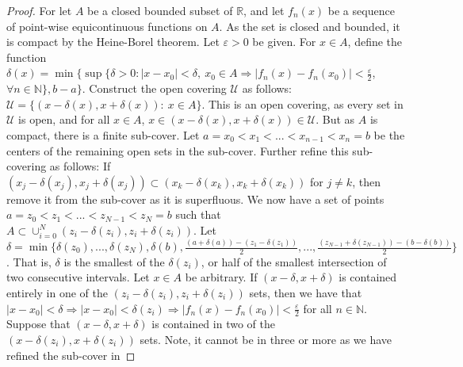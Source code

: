 \documentclass[crop=false,class=book,oneside]{standalone}
\begin{document}
            \begin{proof}
                For let $A$ be a closed bounded subset
                of $\mathbb{R}$, and let $f_n(x)$ be a sequence
                of point-wise equicontinuous functions on $A$.
                As the set is closed and bounded, it is compact
                by the Heine-Borel theorem. Let $\varepsilon>0$
                be given. For $x\in A$, define the function
                $\delta(x)%
                 =\min\{\sup\{\delta>0:|x-x_0|<\delta,\ x_0\in A%
                  \Rightarrow |f_n(x)-f_n(x_0)|<\frac{\varepsilon}{2}$,
                $\forall n\in\mathbb{N}\},b-a\}$.
                Construct the open covering $\mathcal{U}$ as
                follows:
                $\mathcal{U}=\{(x-\delta(x),x+\delta(x)):\ x\in A\}$.
                This is an open covering, as every set in
                $\mathcal{U}$ is open, and for all
                $x\in A$, $x\in(x-\delta(x),x+\delta(x))\in\mathcal{U}$.
                But as $A$ is compact, there is a finite sub-cover.
                Let $a=x_0<x_1<...<x_{n-1}<x_n=b$ be the centers
                of the remaining open sets in the sub-cover.
                Further refine this sub-covering as follows: If
                $(x_j-\delta(x_j),x_j+\delta(x_j))%
                 \subset (x_k-\delta(x_k),x_k+\delta(x_k))$
                for $j\ne k$, then remove it from the sub-cover as
                it is superfluous. We now have a set of points
                $a=z_0<z_1<...<z_{N-1}<z_N=b$ such that
                $A\subset\cup_{i=0}^{N} (z_i-\delta(z_i),z_i+\delta(z_i))$.
                Let
                $\delta%
                 =\min\{\delta(z_0),...,\delta(z_N),\delta(b),%
                        \frac{(a+\delta(a))-(z_1-\delta(z_1))}{2},%
                        ...,%
                        \frac{(z_{N-1}+\delta(z_{N-1}))-(b-\delta(b))}{2}\}$.
                That is, $\delta$ is the smallest of the $\delta(z_i)$,
                or half of the smallest intersection of two consecutive
                intervals. Let $x\in A$ be arbitrary. If $(x-\delta,x+\delta)$
                is contained entirely in one of the
                $(z_i-\delta(z_i),z_i+\delta(z_i))$ sets, then we have
                that $|x-x_0|<\delta \Rightarrow |x-x_0| <\delta(z_i) \Rightarrow |f_n(x)-f_n(x_0)|<\frac{\varepsilon}{2}$ for all $n\in\mathbb{N}$.
                Suppose that $(x-\delta,x+\delta)$ is contained in two of
                the $(x-\delta(z_i),x+\delta(z_i))$ sets. Note, it cannot
                be in three or more as we have refined the sub-cover in

\end{proof}
\end{document}
